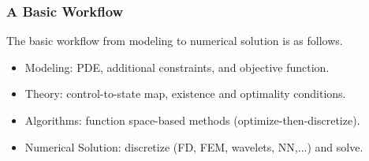 \documentclass[aspectratio=169,xcolor=dvipsnames,10pt]{beamer}
\begin{document}
\begin{frame}\frametitle{A Basic Workflow}
\begin{exampleblock}{}
The basic workflow from modeling to numerical solution is as follows.
\begin{itemize}
\item Modeling: PDE, additional constraints, and objective function.

\item Theory: control-to-state map, existence and optimality conditions.

\item Algorithms: function space-based methods (optimize-then-discretize).

\item Numerical Solution: discretize (FD, FEM, wavelets, NN,...) and solve.
\end{itemize}
\end{exampleblock}
\end{frame}

\end{document}
